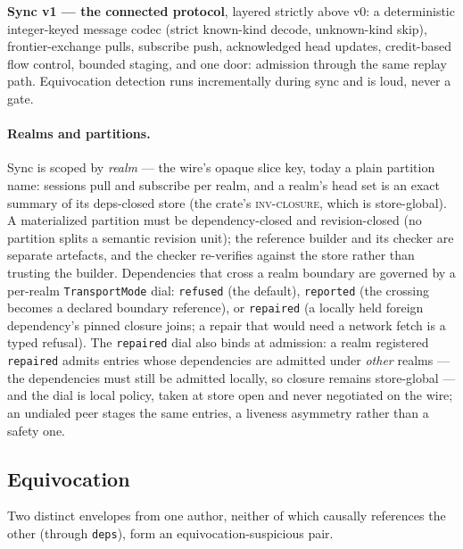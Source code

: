 \textbf{Sync v1 — the connected protocol}, layered strictly above v0:
a deterministic integer-keyed message codec (strict known-kind
decode, unknown-kind skip), frontier-exchange pulls, subscribe push,
acknowledged head updates, credit-based flow control, bounded
staging, and one door: admission through the same replay path.
Equivocation detection runs incrementally during sync and is loud,
never a gate.

\paragraph{Realms and partitions.} Sync is scoped by \emph{realm} —
the wire's opaque slice key, today a plain partition name: sessions
pull and subscribe per realm, and a realm's head set is an exact
summary of its deps-closed store (the crate's \textsc{inv-closure},
which is store-global). A materialized partition must be
dependency-closed and revision-closed (no partition splits a semantic
revision unit); the reference builder and its checker are separate
artefacts, and the checker re-verifies against the store rather than
trusting the builder. Dependencies that cross a realm boundary are
governed by a per-realm \texttt{TransportMode} dial:
\texttt{refused} (the default), \texttt{reported} (the crossing
becomes a declared boundary reference), or \texttt{repaired} (a
locally held foreign dependency's pinned closure joins; a repair that
would need a network fetch is a typed refusal). The \texttt{repaired}
dial also binds at admission: a realm registered \texttt{repaired}
admits entries whose dependencies are admitted under \emph{other}
realms — the dependencies must still be admitted locally, so closure
remains store-global — and the dial is local policy, taken at store
open and never negotiated on the wire; an undialed peer stages the
same entries, a liveness asymmetry rather than a safety one.

\subsection{Equivocation}
\label{sec:gr-sync-equivocation}

\begin{definition}
\label{def:gr-equivocation}
Two distinct envelopes from one author, neither of which causally
references the other (through \texttt{deps}), form an
equivocation-suspicious pair.
\end{definition}

